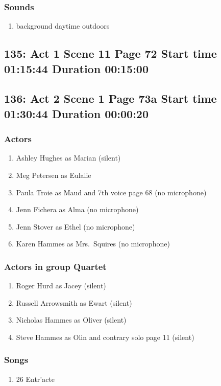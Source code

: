 \subsubsection{Sounds}
\begin{enumerate}
\item background daytime outdoors
\end{enumerate}
\subsection{135: Act 1 Scene 11 Page 72 Start time 01:15:44 Duration 00:15:00}

\subsection{136: Act 2 Scene 1 Page 73a Start time 01:30:44 Duration 00:00:20}

\subsubsection{Actors}
\begin{enumerate}
\item Ashley Hughes as Marian (silent)
\item Meg Petersen as Eulalie
\item Paula Troie as Maud and 7th voice page 68 (no microphone)
\item Jenn Fichera as Alma (no microphone)
\item Jenn Stover as Ethel (no microphone)
\item Karen Hammes as Mrs.~Squires (no microphone)
\end{enumerate}
\subsubsection{Actors in group Quartet}
\begin{enumerate}
\item Roger Hurd as Jacey (silent)
\item Russell Arrowsmith as Ewart (silent)
\item Nicholas Hammes as Oliver (silent)
\item Steve Hammes as Olin and contrary solo page 11 (silent)
\end{enumerate}

\subsubsection{Songs}
\begin{enumerate}
\item 26 Entr'acte
\end{enumerate}
